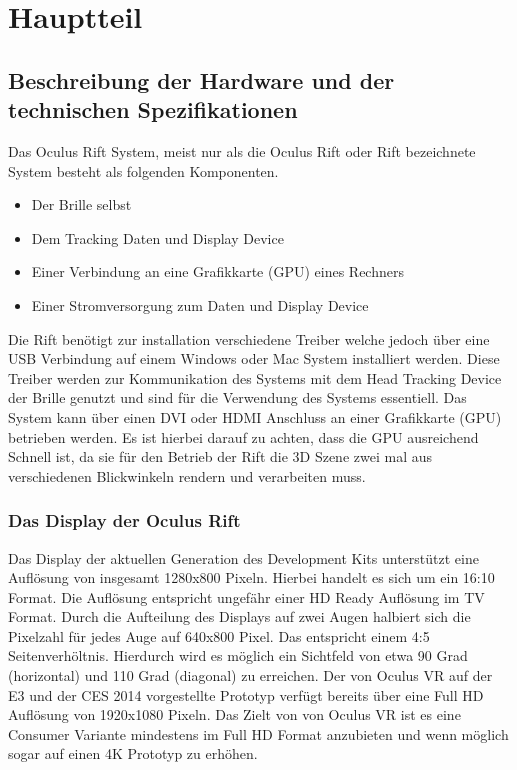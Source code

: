 \documentclass[pagesize, paper=a4, fontsize=12pt,titlepage=true, headings=small, headnosepline, abstractoff, liststotoc, nochapterprefix, plainheadsepline]{scrreprt}
\begin{document}
\chapter{Hauptteil}
\section{Beschreibung der Hardware und der technischen Spezifikationen}
Das Oculus Rift System, meist nur als die Oculus Rift oder Rift bezeichnete System besteht als folgenden Komponenten.
\begin{itemize}
\item Der Brille selbst
\item Dem Tracking Daten und Display Device
\item Einer Verbindung an eine Grafikkarte (GPU) eines Rechners
\item Einer Stromversorgung zum Daten und Display Device
\end{itemize}
Die Rift benötigt zur installation verschiedene Treiber welche jedoch über eine USB Verbindung auf einem Windows oder Mac System installiert werden. Diese Treiber werden zur Kommunikation des Systems mit dem Head Tracking Device der Brille genutzt und sind für die Verwendung des Systems essentiell. Das System kann über einen DVI oder HDMI Anschluss an einer Grafikkarte (GPU) betrieben werden. Es ist hierbei darauf zu achten, dass die GPU ausreichend Schnell ist, da sie für den Betrieb der Rift die 3D Szene zwei mal aus verschiedenen Blickwinkeln rendern und verarbeiten muss.

\subsection{Das Display der Oculus Rift}
Das Display der aktuellen Generation des Development Kits unterstützt eine Auflösung von insgesamt 1280x800 Pixeln. Hierbei handelt es sich um ein 16:10 Format. Die Auflösung entspricht ungefähr einer HD Ready Auflösung im TV Format. Durch die Aufteilung des Displays auf zwei Augen halbiert sich die Pixelzahl für jedes Auge auf 640x800 Pixel. Das entspricht einem 4:5 Seitenverhöltnis. Hierdurch wird es möglich ein Sichtfeld von etwa 90 Grad (horizontal) und 110 Grad (diagonal) zu erreichen. Der von Oculus VR auf der E3 und der CES 2014 vorgestellte Prototyp verfügt bereits über eine Full HD Auflösung von 1920x1080 Pixeln. Das Zielt von von Oculus VR ist es eine Consumer Variante mindestens im Full HD Format anzubieten und wenn möglich sogar auf einen 4K Prototyp zu erhöhen.
\end{document}
